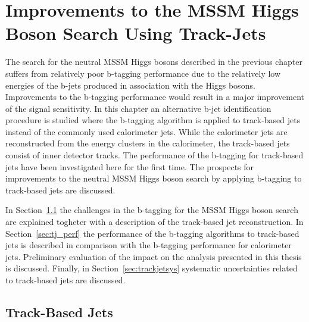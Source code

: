 \chapter{Improvements to the MSSM Higgs Boson Search Using Track-Jets} \label{chap:trackjet}

The search for the neutral MSSM Higgs bosons described in the previous chapter
suffers  from  relatively poor b-tagging performance due to the relatively low energies of
the b-jets produced in association with the Higgs bosons.
Improvements to the b-tagging performance would result in a major improvement of the signal sensitivity. 
In this chapter an alternative b-jet identification procedure is studied where  the b-tagging algorithm is applied to 
track-based jets instead of the commonly used calorimeter jets. While the calorimeter jets are reconstructed
from the energy clusters in the calorimeter, the track-based jets consist of inner detector tracks.
The performance of the b-tagging for track-based jets have been investigated here for the first time.
The prospects for improvements to the neutral MSSM Higgs boson search  by applying b-tagging to track-based jets
are discussed. 

In Section~\ref{sec:tj_intro} the challenges in the b-tagging for  the MSSM Higgs boson search are explained
togheter with a description of the track-based jet reconstruction. 
In Section~\ref{sec:tj_perf} the performance of the  b-tagging algorithms to track-based jets is described 
in comparison with the b-tagging performance for calorimeter jets. Preliminary evaluation of the impact on the
analysis presented in this thesis is discussed. Finally, in Section~\ref{sec:trackjetsys} 
systematic uncertainties related to track-based jets are discussed.


\restoregeometry
\clearpage

\section{Track-Based Jets} \label{sec:tj_intro}

